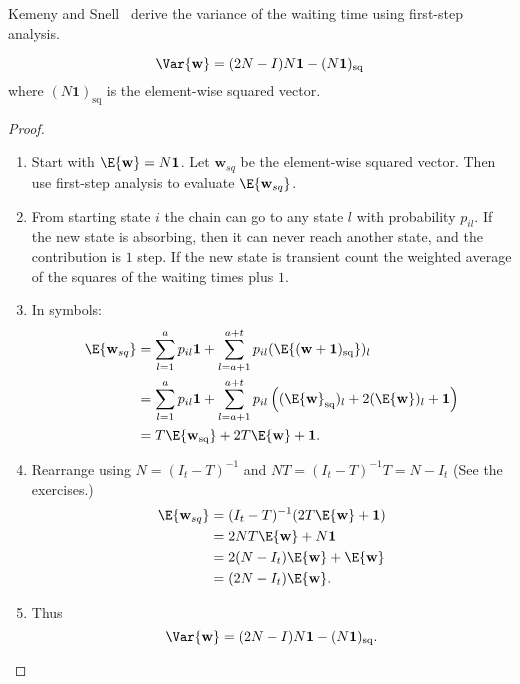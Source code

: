 \documentclass[12pt]{article}
\begin{document}
Kemeny and Snell~%
\cite[page 51]{kemeny60} derive the variance of the waiting time using
first-step analysis.

\begin{theorem}
    \label{thm:waitingtimeabsorption:varwaittime}
    \[
        \Var{\mathbf{w}} = (2N - I)N\mathbf{1} - (N\mathbf{1})_{\text{sq}}
    \] where \( (N\mathbf{1})_{\text{sq}} \) is the element-wise squared
    vector.
\end{theorem}

\begin{proof}
    \begin{enumerate}
        \item
            Start with \( \E{\mathbf{w}} = N \mathbf{1} \).  Let \(
            \mathbf{w}_{sq} \) be the element-wise squared vector.  Then
            use first-step analysis to evaluate \( \E{\mathbf{w}_{sq}} \).
        \item
            From starting state \( i \) the chain can go to any state \(
            l \) with probability \( p_{il} \).  If the new state is
            absorbing, then it can never reach another state, and the
            contribution is \( 1 \) step.  If the new state is transient
            count the weighted average of the squares of the waiting
            times plus \( 1 \).
        \item
            In symbols:
            \begin{align*}
                \E{\mathbf{w}_{sq}} &= \sum\limits_{l=1}^{a} p_{il}
                \mathbf{1} + \sum\limits_{l=a+1}^{a+t} p_{il} (\E{(\mathbf
                {w}+\mathbf{1})_{\text{sq}} })_l \\
                &= \sum\limits_{l=1}^{a} p_{il} \mathbf{1} + \sum\limits_
                {l=a+1}^{a+t} p_{il} \left( (\E{\mathbf{w}}_{\text{sq}})_l
                + 2 (\E{\mathbf{w}})_l + \mathbf{1} \right) \\
                &= T \E{\mathbf{w}_{\text{sq}}} + 2 T\E{\mathbf{w}} +
                \mathbf{1}.
            \end{align*}
        \item
            Rearrange using \( N = (I_t - T)^{-1} \) and \( NT = (I_t -
            T)^{-1} T = N - I_t \) (See the exercises.)
            \begin{align*}
                \E{\mathbf{w}_{sq}} &= (I_t - T)^{-1} (2 T\E{\mathbf{w}}
                + \mathbf{1}) \\
                &= 2NT \E{\mathbf{w}} + N \mathbf{1} \\
                &= 2(N-I_t) \E{\mathbf{w}} + \E{\mathbf{w}} \\
                &= (2N-I_t) \E{\mathbf{w}}.
            \end{align*}
        \item
            Thus
            \[
                \Var{\mathbf{w}} = (2N - I)N\mathbf{1} - (N\mathbf{1})_{\text
                {sq}}.
            \]
    \end{enumerate}
\end{proof}
\end{document}
